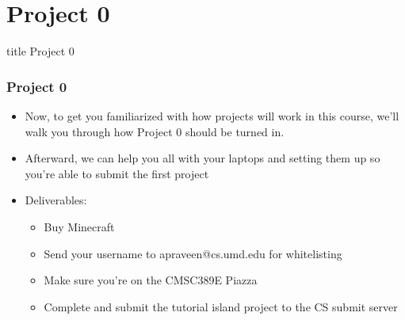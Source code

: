\documentclass{beamer}
\begin{document}
     	\section{Project 0}
     	
     		\begin{frame}
         	\vfill
         	\centering
          	\begin{beamercolorbox}[sep=8pt,center,shadow=true,rounded=true]{title}
           	Project 0\par%
        	\end{beamercolorbox}
            \vfill
       	\end{frame}
       	
       	\begin{frame}
                \frametitle{Project 0}
                    \begin{itemize}
                        \item Now, to get you familiarized with how projects will work in this course, we'll walk you through how Project 0 should be turned in.
                        \item Afterward, we can help you all with your laptops and setting them up so you're able to submit the first project
                        \item Deliverables:
                        \begin{itemize}
                        	\item Buy Minecraft 
                        	\item Send your username to apraveen@cs.umd.edu for whitelisting
                        	\item Make sure you're on the CMSC389E Piazza
                        	\item Complete and submit the tutorial island project to the CS submit server
                        	
                        \end{itemize}
                    \end{itemize}
            \end{frame}
            
            
    
    
\end{document}

